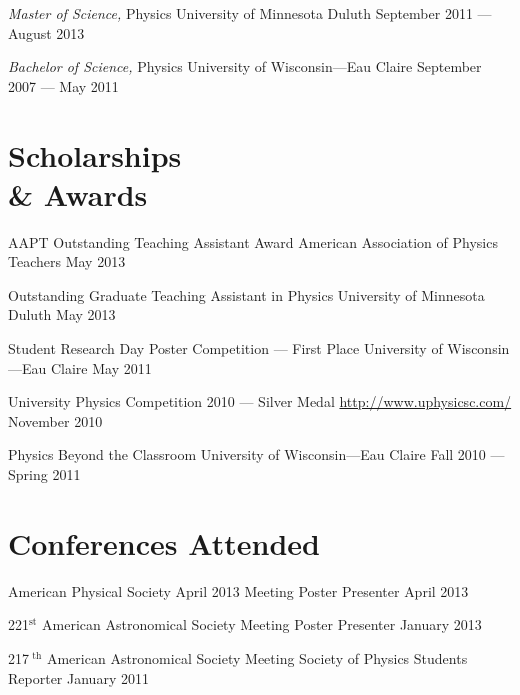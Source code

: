 \documentclass[margin,line,letterpaper]{res}
\begin{document}
\begin{resume}
\object																		
{\emph{Master of Science,} Physics}											
{\rm University of Minnesota Duluth}											
{September 2011 --- August 2013}	


\object
{\emph{Bachelor of Science,} Physics}											
{\rm University of Wisconsin---Eau Claire}									
{September 2007 --- May 2011}


\sectSep


\section{Scholarships \\ \& Awards}



\object
{AAPT Outstanding Teaching Assistant Award}
{American Association of Physics Teachers}
{May 2013}


\object
{Outstanding Graduate Teaching Assistant in Physics}
{University of Minnesota Duluth}
{May 2013}


\object
{Student Research Day Poster Competition --- First Place}
{University of Wisconsin---Eau Claire}
{May 2011}


\object
{University Physics Competition 2010 --- Silver Medal}
{\rm \href{http://www.uphysicsc.com/}{http://www.uphysicsc.com/} }
{November 2010}


\object
{Physics Beyond the Classroom}
{University of Wisconsin---Eau Claire}
{Fall 2010 --- Spring 2011}



\sectSep


\section{Conferences Attended}



\object
{American Physical Society April 2013 Meeting}
{Poster Presenter}
{April 2013}


\object
{221$^\text{st}$ American Astronomical Society Meeting}
{Poster Presenter}
{January 2013}


\object
{217$^\text{ th}$ American Astronomical Society Meeting}
{Society of Physics Students Reporter}
{January 2011}



\end{resume}
\end{document}
